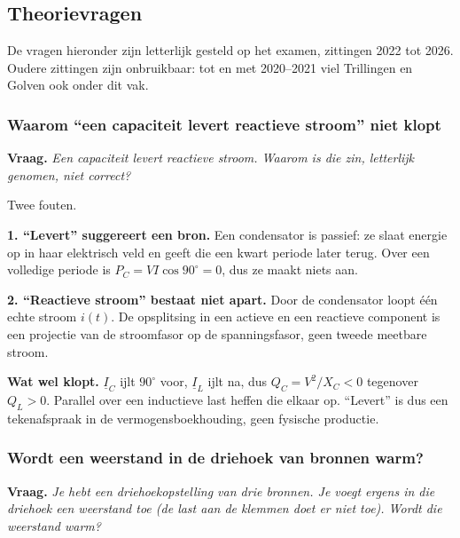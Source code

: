 \documentclass[a4paper,11pt]{article}
\begin{document}
\subsection{Theorievragen}

De vragen hieronder zijn letterlijk gesteld op het examen, zittingen 2022 tot 2026. Oudere
zittingen zijn onbruikbaar: tot en met 2020--2021 viel Trillingen en Golven ook onder dit vak.

\subsubsection{Waarom ``een capaciteit levert reactieve stroom'' niet klopt}

\textbf{Vraag.} \textit{Een capaciteit levert reactieve stroom. Waarom is die zin, letterlijk
    genomen, niet correct?}

\begin{oefenblok}[Antwoord]
    Twee fouten.

    \textbf{1. ``Levert'' suggereert een bron.} Een condensator is passief: ze slaat energie op in
    haar elektrisch veld en geeft die een kwart periode later terug. Over een volledige periode is
    $P_C = V I \cos 90^\circ = 0$, dus ze maakt niets aan.

    \textbf{2. ``Reactieve stroom'' bestaat niet apart.} Door de condensator loopt \'e\'en echte
    stroom $i(t)$. De opsplitsing in een actieve en een reactieve component is een projectie van de
    stroomfasor op de spanningsfasor, geen tweede meetbare stroom.

    \textbf{Wat wel klopt.} $\underline{I}_C$ ijlt $90^\circ$ voor, $\underline{I}_L$ ijlt na, dus
    $Q_C = V^2/X_C < 0$ tegenover $Q_L > 0$. Parallel over een inductieve last heffen die elkaar op.
    ``Levert'' is dus een tekenafspraak in de vermogensboekhouding, geen fysische productie.
\end{oefenblok}

\subsubsection{Wordt een weerstand in de driehoek van bronnen warm?}

\textbf{Vraag.} \textit{Je hebt een driehoekopstelling van drie bronnen. Je voegt ergens in die
    driehoek een weerstand toe (de last aan de klemmen doet er niet toe). Wordt die weerstand warm?}
\end{document}
